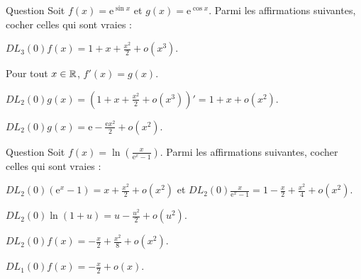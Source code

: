 \begin{multi}[multiple,feedback=
{Avec \(\displaystyle u=\sin x=x-\frac{x^3}{6}+o(x^3)\) et \(\displaystyle \mathrm{e}^u=1+u+\frac{u^2}{2}+\frac{u^3}{6}+o(u^3)\), on obtient
\[\displaystyle DL_3(0)f(x)=1+x+\frac{x^2}{2}+o(x^3).\]
Or \(\displaystyle g(x)=\mathrm{e}.\mathrm{e}^{\cos x-1}\). Donc, avec \(\displaystyle u=\cos x-1=-\frac{x^2}{2}+o(x^2)\) et \(\mathrm{e}^u=1+u+\frac{u^2}{2}+o(u^3)\), on obtient : \(\displaystyle DL_2(0)g(x)=\mathrm{e}-\frac{\mathrm{e}.x^2}{2}+o(x^2)\).
}]{Question}
Soit \(\displaystyle f(x)=\mathrm{e}^{\sin x}\) et \(g(x)=\mathrm{e}^{\cos x}\). Parmi les affirmations suivantes, cocher celles qui sont vraies :

    \item* \(\displaystyle DL_3(0)f(x)=1+x+\frac{x^2}{2}+o(x^3)\).
    \item Pour tout \(x\in \mathbb{R}\), \(\displaystyle f'(x)=g(x)\).
    \item \(\displaystyle DL_2(0)g(x)=\left(1+x+\frac{x^2}{2}+o(x^3)\right)'=1+x+o(x^2)\).
    \item* \(\displaystyle DL_2(0)g(x)=\mathrm{e}-\frac{\mathrm{e}x^2}{2}+o(x^2)\).
\end{multi}


\begin{multi}[multiple,feedback=
{On a : \(\displaystyle DL_2(0)(\mathrm{e}^x-1)=x+\frac{x^2}{2}+o(x^2)\) et donc
\[\frac{x}{\mathrm{e}^x-1}=\frac{x}{x+\frac{x^2}{2}+o(x^2)}=\frac{1}{1+\frac{x}{2}+o(x)}=1-\frac{x}{2}+o(x).\]
Pour écrire le \(\displaystyle DL_2(0)\frac{x}{\mathrm{e}^x-1}\), il faut considérer le \(DL_3(0)(\mathrm{e}^x-1)\). Maintenant, avec \(\displaystyle u=\frac{x}{\mathrm{e}^x-1}-1=-\frac{x}{2}+o(x)\), on obtient 
\[\ln\left(\frac{x}{\mathrm{e}^x-1}\right)=\ln (1+u)=u+o(u)=-\frac{x}{2}+o(x).\]
}]{Question}
Soit \(\displaystyle f(x)=\ln\left(\frac{x}{\mathrm{e}^x-1}\right)\). Parmi les affirmations suivantes, cocher celles qui sont vraies :

    \item \(\displaystyle DL_2(0)(\mathrm{e}^x-1)=x+\frac{x^2}{2}+o(x^2)\) et \(\displaystyle DL_2(0)\frac{x}{\mathrm{e}^x-1}=1-\frac{x}{2}+\frac{x^2}{4}+o(x^2)\).
    \item* \(\displaystyle DL_2(0)\ln (1+u)=u-\frac{u^2}{2}+o(u^2)\).
    \item \(\displaystyle DL_2(0)f(x)=-\frac{x}{2}+\frac{x^2}{8}+o(x^2)\).
    \item* \(\displaystyle DL_1(0)f(x)=-\frac{x}{2}+o(x)\).
\end{multi}


